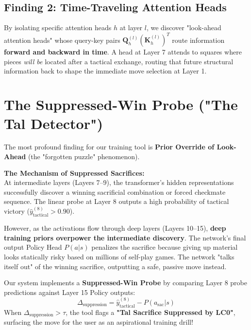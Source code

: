\documentclass[11pt,a4paper]{report}
\begin{document}
\subsection{Finding 2: Time-Traveling Attention Heads}
By isolating specific attention heads $h$ at layer $l$, we discover "look-ahead attention heads" whose query-key pairs $\mathbf{Q}_h^{(l)} (\mathbf{K}_h^{(l)})^T$ route information \textbf{forward and backward in time}. A head at Layer 7 attends to squares where pieces \textit{will be} located after a tactical exchange, routing that future structural information back to shape the immediate move selection at Layer 1.

\section{The Suppressed-Win Probe ("The Tal Detector")}
The most profound finding for our training tool is \textbf{Prior Override of Look-Ahead} (the "forgotten puzzle" phenomenon).

\begin{mdframed}[backgroundcolor=red!5]
\textbf{The Mechanism of Suppressed Sacrifices:}\\
At intermediate layers (Layers 7--9), the transformer's hidden representations successfully discover a winning sacrificial combination or forced checkmate sequence. The linear probe at Layer 8 outputs a high probability of tactical victory ($\hat{y}_{\text{tactical}}^{(8)} > 0.90$).

However, as the activations flow through deep layers (Layers 10--15), \textbf{deep training priors overpower the intermediate discovery}. The network's final output Policy Head $P(a|s)$ penalizes the sacrifice because giving up material looks statically risky based on millions of self-play games. The network "talks itself out" of the winning sacrifice, outputting a safe, passive move instead.
\end{mdframed}

Our system implements a \textbf{Suppressed-Win Probe} by comparing Layer 8 probe predictions against Layer 15 Policy outputs:
\begin{equation}
\Delta_{\text{suppression}} = \hat{y}_{\text{tactical}}^{(8)} - P(a_{\text{sac}}|s)
\end{equation}
When $\Delta_{\text{suppression}} > \tau$, the tool flags a \textbf{"Tal Sacrifice Suppressed by LC0"}, surfacing the move for the user as an aspirational training drill!

\newpage
\end{document}
